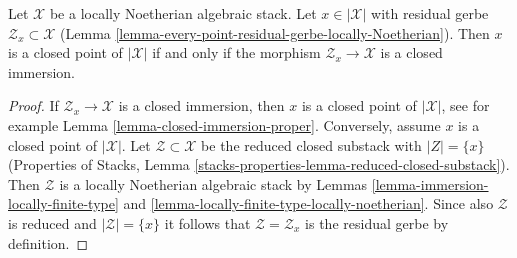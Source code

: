 \begin{lemma}
\label{lemma-residual-space-closed}
Let $\mathcal{X}$ be a locally Noetherian algebraic stack.
Let $x \in |\mathcal{X}|$ with residual gerbe
$\mathcal{Z}_x \subset \mathcal{X}$
(Lemma \ref{lemma-every-point-residual-gerbe-locally-Noetherian}).
Then $x$ is a closed point of $|\mathcal{X}|$ if and only if
the morphism $\mathcal{Z}_x \to \mathcal{X}$ is a closed immersion.
\end{lemma}

\begin{proof}
If $\mathcal{Z}_x \to \mathcal{X}$ is a closed immersion, then
$x$ is a closed point of $|\mathcal{X}|$, see for example
Lemma \ref{lemma-closed-immersion-proper}.
Conversely, assume $x$ is a closed point of $|\mathcal{X}|$.
Let $\mathcal{Z} \subset \mathcal{X}$
be the reduced closed substack with $|Z| = \{x\}$
(Properties of Stacks,
Lemma \ref{stacks-properties-lemma-reduced-closed-substack}).
Then $\mathcal{Z}$ is a locally Noetherian algebraic stack
by Lemmas \ref{lemma-immersion-locally-finite-type} and
\ref{lemma-locally-finite-type-locally-noetherian}.
Since also $\mathcal{Z}$ is reduced and $|\mathcal{Z}| = \{x\}$
it follows that $\mathcal{Z} = \mathcal{Z}_x$ is the
residual gerbe by definition.
\end{proof}

















